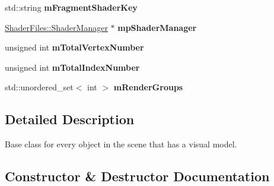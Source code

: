 \begin{DoxyCompactItemize}
\mbox{\label{class_geometry_engine_1_1_geometry_world_item_1_1_geometry_item_1_1_geometry_item_ae29f06e4500932eeee49c751abcc21e6}} 
std\+::string {\bfseries m\+Fragment\+Shader\+Key}
\item 
\mbox{\label{class_geometry_engine_1_1_geometry_world_item_1_1_geometry_item_1_1_geometry_item_a3061167ac14626431dc2939e27ca057d}} 
\mbox{\hyperlink{class_shader_files_1_1_shader_manager}{Shader\+Files\+::\+Shader\+Manager}} $\ast$ {\bfseries mp\+Shader\+Manager}
\item 
\mbox{\label{class_geometry_engine_1_1_geometry_world_item_1_1_geometry_item_1_1_geometry_item_ab0d9901b32b79e25d96cc916739af523}} 
unsigned int {\bfseries m\+Total\+Vertex\+Number}
\item 
\mbox{\label{class_geometry_engine_1_1_geometry_world_item_1_1_geometry_item_1_1_geometry_item_a2aaff93904a831edbf34fa8cffe4e248}} 
unsigned int {\bfseries m\+Total\+Index\+Number}
\item 
\mbox{\label{class_geometry_engine_1_1_geometry_world_item_1_1_geometry_item_1_1_geometry_item_ab435d1849fb6bbe6b03a51520e0c2ee6}} 
std\+::unordered\+\_\+set$<$ int $>$ {\bfseries m\+Render\+Groups}
\end{DoxyCompactItemize}


\subsection{Detailed Description}
Base class for every object in the scene that has a visual model. 

\subsection{Constructor \& Destructor Documentation}
\mbox{\label{class_geometry_engine_1_1_geometry_world_item_1_1_geometry_item_1_1_geometry_item_a4e952dc4d555e736786b78a79e9f5ad4}} 
